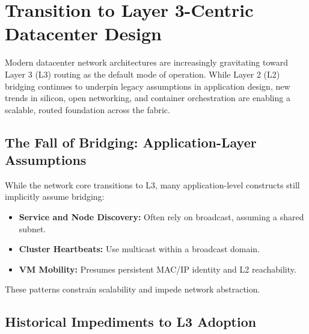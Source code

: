 \documentclass[../../../OAE-SPEC-MAIN.tex]{subfiles}
\begin{document}







\section{Transition to Layer 3-Centric Datacenter Design}

Modern datacenter network architectures are increasingly gravitating toward Layer 3 (L3) routing as the default mode of operation. While Layer 2 (L2) bridging continues to underpin legacy assumptions in application design, new trends in silicon, open networking, and container orchestration are enabling a scalable, routed foundation across the fabric.

\subsection{The Fall of Bridging: Application-Layer Assumptions}

While the network core transitions to L3, many application-level constructs still implicitly assume bridging:

\begin{itemize}
  \item \textbf{Service and Node Discovery:} Often rely on broadcast, assuming a shared subnet.
  \item \textbf{Cluster Heartbeats:} Use multicast within a broadcast domain.
  \item \textbf{VM Mobility:} Presumes persistent MAC/IP identity and L2 reachability.
\end{itemize}

These patterns constrain scalability and impede network abstraction.

\subsection{Historical Impediments to L3 Adoption}
\end{document}
